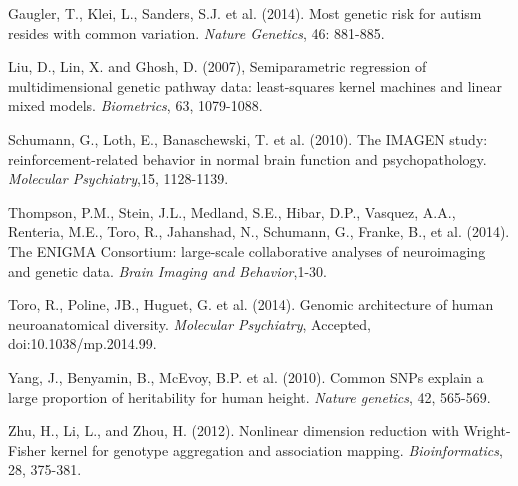 \documentclass[11pt]{article}
\begin{document}
\vspace{-0.1in}
\begin{list}{[]}{\setlength{\parsep}{0in}\setlength{\itemsep}{\adjitsepb}\setlength{\itemindent}{0in}}\item Gaugler, T., Klei, L., Sanders, S.J. et al. (2014). Most genetic risk for autism resides with common variation. \emph{Nature Genetics}, 46: 881-885.

\item Liu, D., Lin, X. and Ghosh, D. (2007), Semiparametric regression of multidimensional genetic pathway data: least-squares kernel machines and linear mixed models. \emph{Biometrics}, 63, 1079-1088. 

\item Schumann, G., Loth, E., Banaschewski, T. et al. (2010). The IMAGEN study: reinforcement-related behavior in normal brain function and psychopathology. \emph{Molecular Psychiatry},15, 1128-1139.

\item Thompson, P.M., Stein, J.L., Medland, S.E., Hibar, D.P., Vasquez, A.A., Renteria, M.E., Toro, R., Jahanshad, N., Schumann, G., Franke, B., et al. (2014). The ENIGMA Consortium: large-scale collaborative analyses of neuroimaging and genetic data. \emph{Brain Imaging and Behavior},1-30.

\item Toro, R., Poline, JB., Huguet, G. et al. (2014). Genomic architecture of human neuroanatomical diversity. \emph{Molecular Psychiatry}, Accepted, doi:10.1038/mp.2014.99.

\item Yang, J., Benyamin, B., McEvoy, B.P. et al. (2010). Common SNPs explain a large proportion of heritability for human height. \emph{Nature genetics}, 42, 565-569.

\item Zhu, H., Li, L., and Zhou, H. (2012). Nonlinear dimension reduction with Wright-Fisher kernel for genotype aggregation and association mapping. \emph{Bioinformatics}, 28, 375-381.
\end{list}
\end{document}
